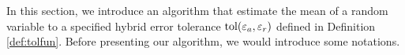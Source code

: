 \documentclass{iitthesis}
\begin{document}
\label{sec:algmeanMCg}
In this section, we introduce an algorithm that estimate the mean of a random variable to a specified hybrid error tolerance $\operatorname{tol}(\varepsilon_a, \varepsilon_r)$ defined in Definition \ref{def:tolfun}. Before presenting our algorithm, we would introduce some notations. 
\end{document}
